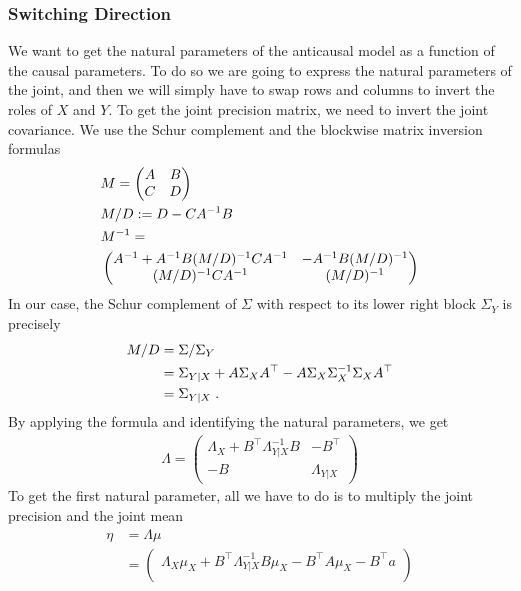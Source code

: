 \begin{subappendices}
\subsubsection{Switching Direction}
We want to get the natural parameters of the anticausal model as a function of the causal parameters.
To do so we are going to express the natural parameters of the joint, and then we will simply have to swap rows and columns to invert the roles of $X$ and $Y$.
To get the joint precision matrix, we need to invert the joint covariance. 
We use the Schur complement and the blockwise matrix inversion formulas
\begin{align*}
    & M = \begin{pmatrix}
    A & B \\
    C & D
    \end{pmatrix} \\
    & M/D := D - CA^{-1} B \\
    & M^{-1} =\\
    &\begin{pmatrix}
    A^{-1} + A^{-1} B (M/D)^{-1} C A ^{-1}  & -A^{-1} B (M/D)^{-1} \\
    (M/D)^{-1} C A ^{-1}  & (M/D)^{-1}
    \end{pmatrix}
\end{align*}
In our case, the Schur complement of $\Sigma$ with respect to its lower right block $\Sigma_Y$ is precisely
\begin{align*}
    M / D
    & =\Sigma / \Sigma_Y \\
    &=  \Sigma_{Y|X} + A\Sigma_X A^\top - A\Sigma_X \Sigma_X^{-1} \Sigma_X A^\top \\
    &= \Sigma_{Y|X} \; .
\end{align*}
By applying the formula and identifying the natural parameters, we get 
\begin{align*}
    \Lambda = \begin{pmatrix}
    \Lambda_X + B^\top \Lambda_{Y|X}^{-1}B & -B^\top \\
    -B & \Lambda_{Y|X}
    \end{pmatrix}
\end{align*}
To get the first natural parameter, all we have to do is to multiply the joint precision and the joint mean
\begin{align*}
    \eta 
    &= \Lambda \mu   \\
    &=\begin{pmatrix}
    \Lambda_X\mu_X + B^\top \Lambda_{Y|X}^{-1}B\mu_X - B^\top A \mu_X  - B^\top a \\

\end{pmatrix}
\end{align*}
\end{subappendices}
